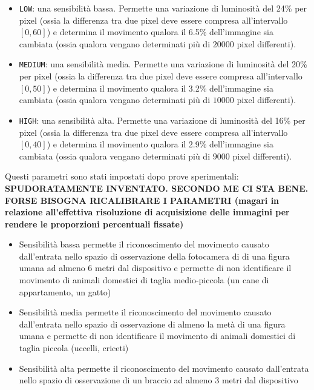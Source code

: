 \begin{itemize}
  \item \texttt{LOW}: una sensibilità bassa. Permette una variazione di luminosità del 24\% per pixel (ossia la differenza tra due pixel deve essere compresa all'intervallo $[0,60]$) e determina il movimento qualora il 6.5\% dell'immagine sia cambiata (ossia qualora vengano determinati più di $20000$ pixel differenti).
  \item \texttt{MEDIUM}: una sensibilità media. Permette una variazione di luminosità del 20\% per pixel (ossia la differenza tra due pixel deve essere compresa all'intervallo $[0,50]$) e determina il movimento qualora il 3.2\% dell'immagine sia cambiata (ossia qualora vengano determinati più di $10000$ pixel differenti).
  \item \texttt{HIGH}: una sensibilità alta. Permette una variazione di luminosità del 16\% per pixel (ossia la differenza tra due pixel deve essere compresa all'intervallo $[0,40]$) e determina il movimento qualora il 2.9\% dell'immagine sia cambiata (ossia qualora vengano determinati più di $9000$ pixel differenti).
\end{itemize}
Questi parametri sono stati impostati dopo prove sperimentali: \textbf{SPUDORATAMENTE INVENTATO. SECONDO ME CI STA BENE. FORSE BISOGNA RICALIBRARE I PARAMETRI (magari in relazione all'effettiva risoluzione di acquisizione delle immagini per rendere le proporzioni percentuali fissate)}
\begin{itemize}
  \item Sensibilità bassa permette il riconoscimento del movimento causato dall'entrata nello spazio di osservazione della fotocamera di di una figura umana ad almeno 6 metri dal dispositivo e permette di non identificare il movimento di animali domestici di taglia medio-piccola (un cane di appartamento, un gatto)
  \item Sensibilità media permette il riconoscimento del movimento causato dall'entrata nello spazio di osservazione di almeno la metà di una figura umana e permette di non identificare il movimento di animali domestici di taglia piccola (uccelli, criceti)
  \item Sensibilità alta permette il riconoscimento del movimento causato dall'entrata nello spazio di osservazione di un braccio ad almeno 3 metri dal dispositivo
\end{itemize}

